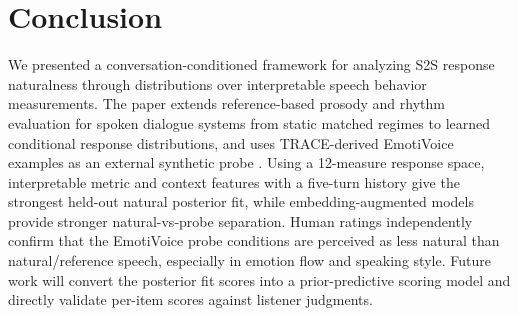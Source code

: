 \documentclass[conference]{IEEEtran}
\begin{document}
\section{Conclusion}
We presented a conversation-conditioned framework for analyzing S2S response naturalness through distributions over interpretable speech behavior measurements.
The paper extends reference-based prosody and rhythm evaluation for spoken dialogue systems from static matched regimes to learned conditional response distributions, and uses TRACE-derived EmotiVoice examples as an external synthetic probe \cite{DISTRIB,TRACE}.
Using a 12-measure response space, interpretable metric and context features with a five-turn history give the strongest held-out natural posterior fit, while embedding-augmented models provide stronger natural-vs-probe separation.
Human ratings independently confirm that the EmotiVoice probe conditions are perceived as less natural than natural/reference speech, especially in emotion flow and speaking style.
Future work will convert the posterior fit scores into a prior-predictive scoring model and directly validate per-item scores against listener judgments.



\end{document}

